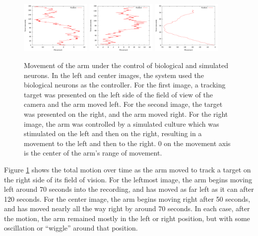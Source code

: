 \documentclass[letterpaper]{article}
\begin{document}
\begin{figure}
	\centering
	\includegraphics[width=0.3\textwidth]{bio_motion_446.png}
	\includegraphics[width=0.3\textwidth]{bio_motion_445.png}
	\includegraphics[width=0.3\textwidth]{simulated_motion.png}
	\caption{Movement of the arm under the control of biological and simulated neurons. In the left and center images, the system used the biological neurons as the controller. For the first image, a tracking target was presented on the left side of the field of view of the camera and the arm moved left. For the second image, the target was presented on the right, and the arm moved right. For the right image, the arm was controlled by a simulated culture which was stimulated on the left and then on the right, resulting in a movement to the left and then to the right. 0 on the movement axis is the center of the arm's range of movement.}
	\label{fig:motion_images}
\end{figure}

Figure \ref{fig:motion_images} shows the total motion over time as the arm moved to track a target on the right side of its field of vision. 
For the leftmost image, the arm begins moving left around 70 seconds into the recording, and has moved as far left as it can after 120 seconds. 
For the center image, the arm begins moving right after 50 seconds, and has moved nearly all the way right by around 70 seconds. 
In each case, after the motion, the arm remained mostly in the left or right position, but with some oscillation or ``wiggle'' around that position. 
\end{document}

